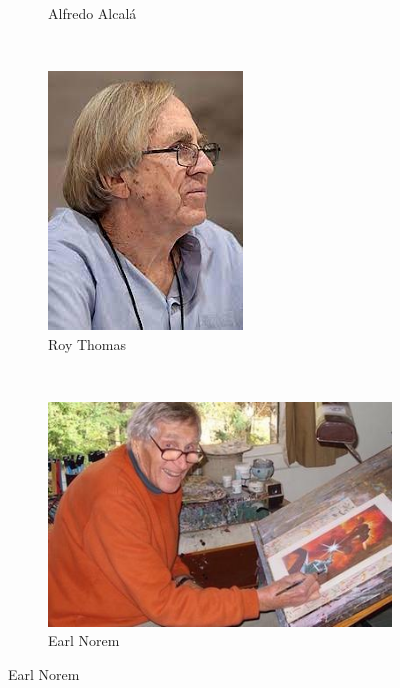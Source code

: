 \begin{frame}{}
\begin{figure}[htp]
\begin{subfigure}[b]{0.16\textwidth}
   \caption{Alfredo Alcalá}
 \end{subfigure}
 ~
 \begin{subfigure}[b]{0.16\textwidth}
   \includegraphics[width=\textwidth]{img/artistas/RoyThomas}
   \caption{Roy Thomas}
 \end{subfigure}
~
 \begin{subfigure}[b]{0.16\textwidth}
   \includegraphics[width=\textwidth]{img/artistas/EarlNorem}
   \caption{Earl Norem}
 \end{subfigure}
\end{figure}
\end{frame}

